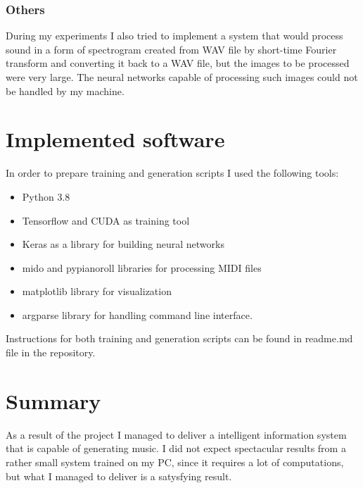 \documentclass[]{article}
\begin{document}
\subsubsection{Others}

During my experiments I also tried to implement a system that would process sound in a form of spectrogram created from WAV file by short-time Fourier transform and converting it back to a WAV file, but the images to be processed were very large. The neural networks capable of processing such images could not be handled by my machine.

\clearpage

\section{Implemented software}

In order to prepare training and generation scripts I used the following tools:

\begin{itemize}
	\item Python 3.8
	\item Tensorflow and CUDA as training tool
	\item Keras as a library for building neural networks
	\item mido and pypianoroll libraries for processing MIDI files
	\item matplotlib library for visualization
	\item argparse library for handling command line interface.
\end{itemize}

Instructions for both training and generation scripts can be found in readme.md file in the repository.

\section{Summary}

As a result of the project I managed to deliver a intelligent information system that is capable of generating music. I did not expect spectacular results from a rather small system trained on my PC, since it requires a lot of computations, but what I managed to deliver is a satysfying result.



\end{document}
